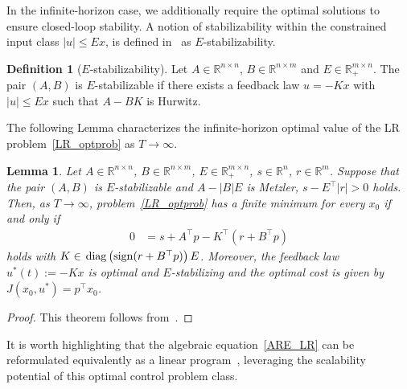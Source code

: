 \documentclass[letterpaper, 10 pt, conference]{ieeeconf}
\newtheorem{lem}[thm]{Lemma}
\theoremstyle{definition}
\newtheorem{defn}{Definition}
\begin{document}
In the infinite-horizon case, we additionally require the optimal solutions to ensure closed-loop stability. A notion of stabilizability within the constrained input class $|u|\leq Ex$, is defined in~\cite{LR_paperII} as $E$-stabilizability.
\begin{defn}[$E$-stabilizability]\label{Estab}
    Let $A \in \mathbb{R}^{n\times n}$, $B \in \mathbb{R}^{n\times m }$ and $E  \in \mathbb{R}_{+}^{m \times n}$. The pair $(A,B)$ is $E$-stabilizable if there exists a feedback law $u=-Kx$ with $\left|u \right|\leq Ex$ such that $A-BK$ is Hurwitz. 
\end{defn}
The following Lemma characterizes the infinite-horizon optimal value of the LR problem~\eqref{LR_optprob} as $T\rightarrow \infty$.
\begin{lem}\label{LR_inf_thm}
    Let  $A\in \mathbb{R}^{n\times n}$, $B\in \mathbb{R}^{n\times m }$, $E  \in \mathbb{R}_{+}^{m \times n}$, $s \in \mathbb{R}^{n} $, $r\in \mathbb R^m$. Suppose that the pair $(A,B)$ is $E$-stabilizable and $A-|B|E$ is Metzler, $s-E^{\top}|r| >0$ holds. %
    Then, as $T\rightarrow \infty$, problem~\eqref{LR_optprob} has a finite minimum for every $x_0$ if and only if
\vspace{-7pt}
\begin{align}\label{ARE_LR}
    0&= s+A^{\top}p-K^{\top} (r+B^{\top}p)  
\end{align}
holds with $K \in \hspace{0.5mm}\mathrm{diag}\left(\mathrm{sign}( r+B^{\top} p)\right)E$.  
Moreover, the feedback law $u^*(t) := -Kx$ is optimal and $E$-stabilizing and the optimal cost is given by $J(x_0, u^*)= p^{\top}x_0$.
\end{lem}
\begin{proof}
This theorem follows from~\cite[Cor. 7]{LR_paperII}.
\end{proof}

It is worth highlighting that the algebraic equation~\eqref{ARE_LR} can be reformulated equivalently as a linear program~\cite[Thm. 12]{LR_paperII}, leveraging the scalability potential of this optimal control problem class.
\end{document}
